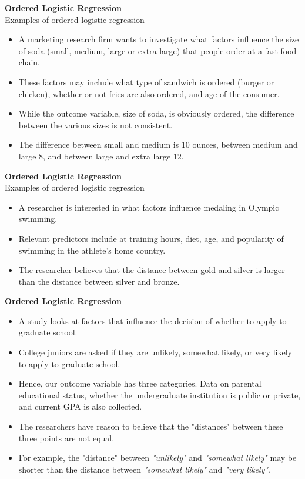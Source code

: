 \documentclass[00-GLMregslides.tex]{subfiles}
\begin{document}
\begin{frame}
	\large
\textbf{Ordered Logistic Regression}\\
Examples of ordered logistic regression
\begin{itemize}
\item A marketing research firm wants to investigate what factors influence the size of soda (small, medium, large or extra large) that 
people order at a fast-food chain. 
\item These factors may include what type of sandwich is ordered (burger or chicken), whether or not fries are also ordered, and age of the consumer. 
\item While the outcome variable, size of soda, is obviously ordered, the difference between the various sizes is not consistent. 
\item The difference between small and medium is 10 ounces, between medium and large 8, and between large and extra large 12.
\end{itemize}
\end{frame}
\begin{frame}
	\large
\textbf{Ordered Logistic Regression}\\
Examples of ordered logistic regression
\begin{itemize}
\item A researcher is interested in what factors influence medaling in Olympic swimming. 
\item Relevant predictors include at training hours, diet, age, and popularity of swimming in the athlete's home country. 
\item The researcher believes that the distance between gold and silver is larger than the distance between silver and bronze.
\end{itemize}
\end{frame}
\begin{frame}
	\large
\textbf{Ordered Logistic Regression}

\begin{itemize}
\item 
A study looks at factors that influence the decision of whether to apply to graduate school. 
\item College juniors are asked if they are unlikely, somewhat likely, or very likely to apply to graduate school. 
\item Hence, our outcome variable has three categories. Data on parental educational status, whether the undergraduate institution is public or private, 
and current GPA is also collected. 
\item The researchers have reason to believe that the "distances" between these three points are not equal. 
\item For example, the "distance" between \textit{"unlikely"} and \textit{"somewhat likely"} may be shorter than the distance between \textit{"somewhat likely"} and \textit{"very likely"}.
\end{itemize}
\end{frame}
\end{document}
